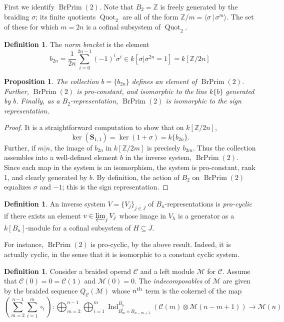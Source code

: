 \documentclass[12pt]{article}
\DeclareMathOperator{\Quot}{Quot}
\DeclareMathOperator{\Ind}{Ind}
\DeclareMathOperator{\BrPrim}{BrPrim}
\newcommand{\field}[1]{\mathbb{#1}}
\newcommand{\Z}{\field{Z}}
\newcommand{\CC} {\mathcal{C}}
\newcommand{\bS} {\mathbf{S}}
\newcommand{\MM}{\mathcal{M}}
\newcommand{\nth}{\textsuperscript{th}}
\theoremstyle{plain}
\newtheorem{prop}[thm]{Proposition}
\theoremstyle{definition}
\newtheorem{defn}[thm]{Definition}
\theoremstyle{remark}
\begin{document}
First we identify $\BrPrim(2)$.  Note that $B_2 = \Z$ is freely generated by the braiding $\sigma$; its finite quotients $\Quot_2$ are all of the form $\Z/m = \langle \sigma \, | \, \sigma^m \rangle$.  The set of these for which $m=2n$ is a cofinal subsystem of $\Quot_2$.

\begin{defn} The \emph{norm bracket} is the element
%
$$b_{2n} = \frac{1}{2n} \sum_{i=0}^{2n-1} (-1)^i \sigma^i \in k[\sigma |  \sigma^{2n} = 1] = k[\Z/2n]$$

\end{defn}

\begin{prop} 

The collection $b = \{b_{2n}\}$ defines an element of $\BrPrim(2)$.  Further, $\BrPrim(2)$ is pro-constant, and isomorphic to the line $k\{b\}$ generated by $b$.  Finally, as a $B_2$-representation, $\BrPrim(2)$ is isomorphic to the sign representation.

\end{prop}

\begin{proof}

It is a straightforward computation to show that on $k[\Z/2n]$,
%
$$\ker(\bS_{1,1}) = \ker(1+\sigma) = k\{b_{2n}\}.$$
%
Further, if $m|n$, the image of $b_{2n}$ in $k[\Z/2m]$ is precisely $b_{2m}$.  Thus the collection assembles into a well-defined element $b$ in the inverse system, $\BrPrim(2)$.  Since each map in the system is an isomorphism, the system is pro-constant, rank 1, and clearly generated by $b$.  By definition, the action of $B_2$ on $\BrPrim(2)$ equalizes $\sigma$ and $-1$; this is the sign representation.

\end{proof}

\begin{defn} 

An inverse system $V = \{V_j\}_{j \in J}$ of $B_n$-representations is \emph{pro-cyclic} if there exists an element $v \in \varprojlim_{j} V_j$ whose image in $V_h$ is a generator as a $k[B_n]$-module for a cofinal subsystem of $H \subseteq J$.

\end{defn}

For instance, $\BrPrim(2)$ is pro-cyclic, by the above result.  Indeed, it is actually cyclic, in the sense that it is isomorphic to a constant cyclic system. 

\begin{defn} 

Consider a braided operad $\CC$ and a left module $\MM$ for $\CC$.  Assume that $\CC(0) = 0 = \CC(1)$ and $\MM(0) = 0$.  The \emph{indecomposables} of $\MM$ are given by the braided sequence $Q_{\CC}(\MM)$ whose $n\nth$ term is the cokernel of the map
%
$$\left(\sum_{m=2}^{n-1} \sum_{i=1}^m \circ_i\right): \bigoplus_{m=2}^{n-1} \bigoplus_{i=1}^m \Ind_{B_m^i \times B_{n-m+1}}^{B_n} (\CC(m) \otimes \MM(n-m+1)) \to \MM(n)$$

\end{defn}
\end{document}

